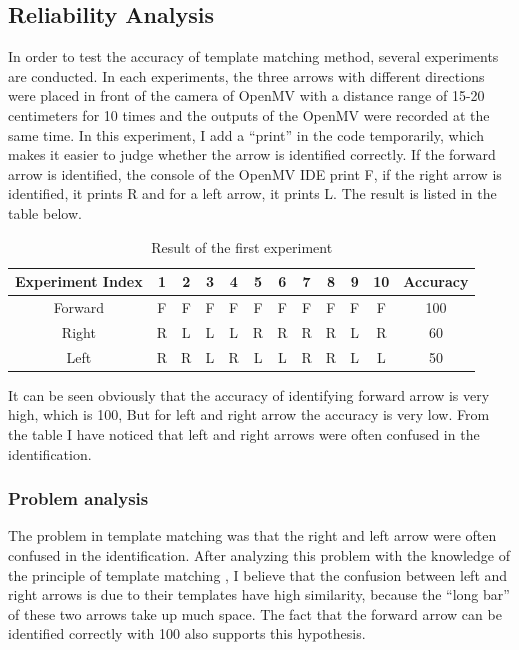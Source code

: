 \documentclass[12pt, a4paper, oneside]{report}
\begin{document}
    \subsection{Reliability Analysis}
In order to test the accuracy of template matching method, several experiments are conducted. In each experiments, the three arrows with different directions were placed in front of the camera of OpenMV with a distance range of 15-20 centimeters for 10 times and the outputs of the OpenMV were recorded at the same time. In this experiment, I add a “print” in the code temporarily, which makes it easier to judge whether the arrow is identified correctly. If the forward arrow is identified, the console of the OpenMV IDE print F, if the right arrow is identified, it prints R and for a left arrow, it prints L. The result is listed in the table below.

\begin{table}[H]
    \centering
\begin{tabular}{|*{12}{c|}}

    \hline
  Experiment Index & 1 & 2 & 3 & 4 & 5 & 6 & 7 & 8 & 9 & 10 & Accuracy\\
    \hline
  Forward & F & F & F & F & F & F & F & F & F & F & 100\text{\%}\\
    \hline
  Right & R & L & L & L & R & R & R & R & L & R & 60\text{\%}\\
    \hline
  Left & R & R & L & R & L & L & R & R & L & L & 50\text{\%}\\
    \hline
  
\end{tabular}
    \caption{Result of the first experiment}
    \label{tab:Result of the first experiment}
\end{table}

It can be seen obviously that the accuracy of identifying forward arrow is very high, which is 100\text{\%}, But for left and right arrow the accuracy is very low. From the table I have noticed that left and right arrows were often confused in the identification.
\subsubsection{Problem analysis}
The problem in template matching was that the right and left arrow were often confused in the identification. After analyzing this problem with the knowledge of  the principle of template matching , I believe that the confusion between left and right arrows is due to their templates have high similarity, because the “long bar” of these two arrows take up much space. The fact that the forward arrow can be identified correctly with 100\text{\%} also supports this hypothesis.
\end{document}
